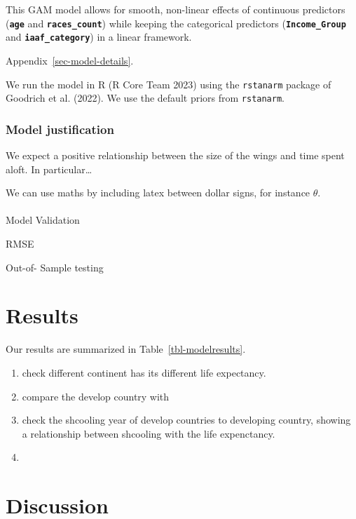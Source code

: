 \documentclass[
  letterpaper,
  DIV=11,
  numbers=noendperiod]{scrartcl}
\makeatletter
\let\oldparagraph\paragraph
\renewcommand{\paragraph}{
    \@ifstar
      \xxxParagraphStar
      \xxxParagraphNoStar
  }
\newcommand{\xxxParagraphStar}[1]{\oldparagraph*{#1}\mbox{}}
\newcommand{\xxxParagraphNoStar}[1]{\oldparagraph{#1}\mbox{}}
\providecommand{\tightlist}{%
  \setlength{\itemsep}{0pt}\setlength{\parskip}{0pt}}\usepackage{longtable,booktabs,array}
\makeatother
\begin{document}
This GAM model allows for smooth, non-linear effects of continuous
predictors (\textbf{\texttt{age}} and \textbf{\texttt{races\_count}})
while keeping the categorical predictors
(\textbf{\texttt{Income\_Group}} and \textbf{\texttt{iaaf\_category}})
in a linear framework.

Appendix~\ref{sec-model-details}.

We run the model in R (R Core Team 2023) using the \texttt{rstanarm}
package of Goodrich et al. (2022). We use the default priors from
\texttt{rstanarm}.

\subsubsection{Model justification}\label{model-justification}

We expect a positive relationship between the size of the wings and time
spent aloft. In particular\ldots{}

We can use maths by including latex between dollar signs, for instance
\(\theta\).

\paragraph{Model Validation}\label{model-validation}

RMSE

Out-of- Sample testing

\section{Results}\label{results}

Our results are summarized in Table~\ref{tbl-modelresults}.

\begin{enumerate}
\def\labelenumi{\arabic{enumi}.}
\tightlist
\item
  check different continent has its different life expectancy.
\item
  compare the develop country with
\item
  check the shcooling year of develop countries to developing country,
  showing a relationship between shcooling with the life expenctancy.
\item
\end{enumerate}

\section{Discussion}\label{discussion}
\end{document}
